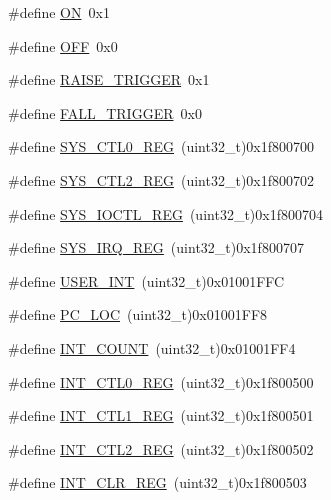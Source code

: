 \begin{DoxyCompactItemize}
\item 
\#define \mbox{\hyperlink{a00020_ad76d1750a6cdeebd506bfcd6752554d2}{ON}}~0x1
\item 
\#define \mbox{\hyperlink{a00020_a29e413f6725b2ba32d165ffaa35b01e5}{O\+FF}}~0x0
\item 
\#define \mbox{\hyperlink{a00020_abda90eda34a640b130f48a6ade23fe22}{R\+A\+I\+S\+E\+\_\+\+T\+R\+I\+G\+G\+ER}}~0x1
\item 
\#define \mbox{\hyperlink{a00020_a9bbaf5b9e2125c7597249c7113b20e6c}{F\+A\+L\+L\+\_\+\+T\+R\+I\+G\+G\+ER}}~0x0
\item 
\#define \mbox{\hyperlink{a00020_ab34acec79daf4fcc12a662cde9e75df7}{S\+Y\+S\+\_\+\+C\+T\+L0\+\_\+\+R\+EG}}~(uint32\+\_\+t)0x1f800700
\item 
\#define \mbox{\hyperlink{a00020_ae6a98a78f9ac0c75c18c7d4e2c62fdcb}{S\+Y\+S\+\_\+\+C\+T\+L2\+\_\+\+R\+EG}}~(uint32\+\_\+t)0x1f800702
\item 
\#define \mbox{\hyperlink{a00020_a43d7770fdd59d1c008b789d8e9ae882b}{S\+Y\+S\+\_\+\+I\+O\+C\+T\+L\+\_\+\+R\+EG}}~(uint32\+\_\+t)0x1f800704
\item 
\#define \mbox{\hyperlink{a00020_ae3e6052bd0e6d9801c5380f2d8d94a17}{S\+Y\+S\+\_\+\+I\+R\+Q\+\_\+\+R\+EG}}~(uint32\+\_\+t)0x1f800707
\item 
\#define \mbox{\hyperlink{a00020_a4358ad34c2ebafd83f49cb8e73fed3d5}{U\+S\+E\+R\+\_\+\+I\+NT}}~(uint32\+\_\+t)0x01001\+F\+FC
\item 
\#define \mbox{\hyperlink{a00020_a61c6c3e2790298ca9bef424e17010ae5}{P\+C\+\_\+\+L\+OC}}~(uint32\+\_\+t)0x01001\+F\+F8
\item 
\#define \mbox{\hyperlink{a00020_a215db83d20cdaad8c4da6d89d47a7aeb}{I\+N\+T\+\_\+\+C\+O\+U\+NT}}~(uint32\+\_\+t)0x01001\+F\+F4
\item 
\#define \mbox{\hyperlink{a00020_a8de95a7e93d24e973c34d5a2acb174d6}{I\+N\+T\+\_\+\+C\+T\+L0\+\_\+\+R\+EG}}~(uint32\+\_\+t)0x1f800500
\item 
\#define \mbox{\hyperlink{a00020_a854bd396a90c4c6b4415c106cb64281f}{I\+N\+T\+\_\+\+C\+T\+L1\+\_\+\+R\+EG}}~(uint32\+\_\+t)0x1f800501
\item 
\#define \mbox{\hyperlink{a00020_a0f7890a929baefa8c8c2cf341d75844e}{I\+N\+T\+\_\+\+C\+T\+L2\+\_\+\+R\+EG}}~(uint32\+\_\+t)0x1f800502
\item 
\#define \mbox{\hyperlink{a00020_a3db4a185cd2de3411b6de2dfee71a009}{I\+N\+T\+\_\+\+C\+L\+R\+\_\+\+R\+EG}}~(uint32\+\_\+t)0x1f800503
\item 

\end{DoxyCompactItemize}
